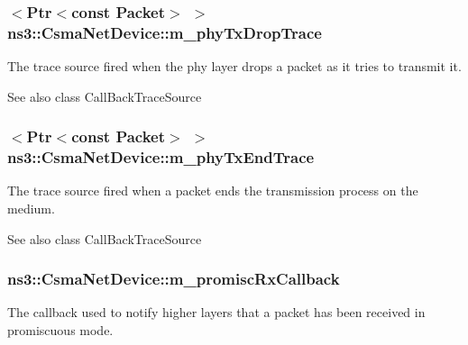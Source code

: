 \subsubsection[{\texorpdfstring{m\+\_\+phy\+Tx\+Drop\+Trace}{m_phyTxDropTrace}}]{$<${\bf Ptr}$<$const {\bf Packet}$>$ $>$ ns3\+::\+Csma\+Net\+Device\+::m\+\_\+phy\+Tx\+Drop\+Trace\hspace{0.3cm}{\ttfamily [private]}}\hypertarget{classns3_1_1CsmaNetDevice_ad2a07cf80f83d9ce17d9280775e9a1f8}{}\label{classns3_1_1CsmaNetDevice_ad2a07cf80f83d9ce17d9280775e9a1f8}
The trace source fired when the phy layer drops a packet as it tries to transmit it.

\begin{DoxySeeAlso}{See also}
class Call\+Back\+Trace\+Source 
\end{DoxySeeAlso}
\subsubsection[{\texorpdfstring{m\+\_\+phy\+Tx\+End\+Trace}{m_phyTxEndTrace}}]{$<${\bf Ptr}$<$const {\bf Packet}$>$ $>$ ns3\+::\+Csma\+Net\+Device\+::m\+\_\+phy\+Tx\+End\+Trace\hspace{0.3cm}{\ttfamily [private]}}\hypertarget{classns3_1_1CsmaNetDevice_a8cac1ff27eec4db589ed00545f942a21}{}\label{classns3_1_1CsmaNetDevice_a8cac1ff27eec4db589ed00545f942a21}
The trace source fired when a packet ends the transmission process on the medium.

\begin{DoxySeeAlso}{See also}
class Call\+Back\+Trace\+Source 
\end{DoxySeeAlso}
\subsubsection[{\texorpdfstring{m\+\_\+promisc\+Rx\+Callback}{m_promiscRxCallback}}]{ ns3\+::\+Csma\+Net\+Device\+::m\+\_\+promisc\+Rx\+Callback\hspace{0.3cm}{\ttfamily [private]}}\hypertarget{classns3_1_1CsmaNetDevice_a4c9c0533341d76fe278fbef18525b228}{}\label{classns3_1_1CsmaNetDevice_a4c9c0533341d76fe278fbef18525b228}
The callback used to notify higher layers that a packet has been received in promiscuous mode. 
